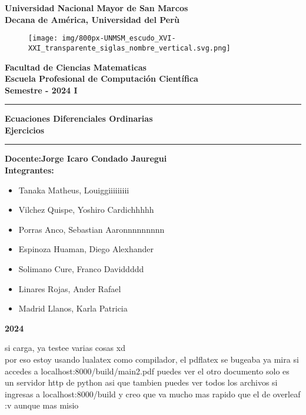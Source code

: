 \documentclass[12pt, a4paper]{article}
\begin{document}
\backgroundsetup{
        placement = center,
        angle = 0,
        scale = 1,
        opacity = 0.8,
}

\begin{titlepage}
\begin{center}
{ \LARGE\textbf{Universidad Nacional Mayor de San Marcos}}\\
 \vspace{3.5mm}
{\large \textbf{Decana de América, Universidad del Perù}}\\
  \vspace{3.5mm}
  \begin{figure}[h]
      \centering
      \texttt{[image: img/800px-UNMSM\_escudo\_XVI-XXI\_transparente\_siglas\_nombre\_vertical.svg.png]}
  \end{figure}
{ \Large\textbf{Facultad de Ciencias Matematicas}}\\
 \vspace{3.5mm}
{ \large\textbf{Escuela Profesional de Computación Científica}}\\
 \vspace{3.5mm}
{ \large\textbf{Semestre - 2024 I}}\\
{\rule{\linewidth}{0.55mm}} 
 { \Large\textbf{Ecuaciones Diferenciales Ordinarias\\ Ejercicios}}\\
{\rule{\linewidth}{0.55mm}} 
{ \large\textbf{Docente:Jorge Icaro Condado Jauregui}}\\ \vspace{3.5mm}
{ \large\textbf{Integrantes: }}\\
 \vspace{3.5mm}
\begin{itemize}
    \item Tanaka Matheus, Louiggiiiiiiiii
    \item Vilchez Quispe, Yoshiro Cardichhhhh
    \item Porras Anco, Sebastian Aaronnnnnnnnn
    \item Espinoza Huaman, Diego Alexhander 
    \item Solimano Cure, Franco Daviddddd 
    \item Linares Rojas, Ander Rafael
    \item Madrid Llanos, Karla Patricia 
\end{itemize}
\vfill
{ \huge\textbf{2024}}
\end{center}
\end{titlepage}
\newpage
si carga, ya testee varias cosas xd \\
por eso estoy usando lualatex como compilador, el
pdflatex se bugeaba
ya mira si accedes a localhost:8000/build/main2.pdf puedes ver el otro documento
solo es un servidor http de python asi que tambien puedes ver todos los archivos
si ingresas a localhost:8000/build
y creo que va mucho mas rapido que
el de overleaf :v aunque mas misio
\end{document}
